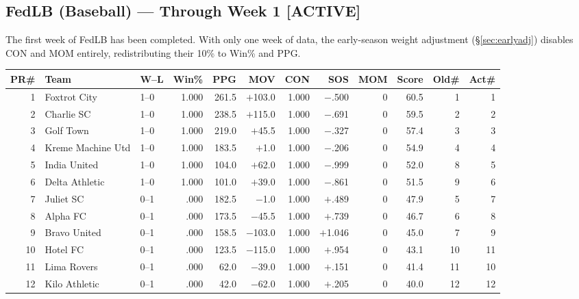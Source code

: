 \documentclass[11pt,a4paper]{article}
\begin{document}
\subsection{FedLB (Baseball) --- Through Week 1 [ACTIVE]}

The first week of FedLB has been completed. With only one week of data, the early-season weight adjustment (\S\ref{sec:earlyadj}) disables CON and MOM entirely, redistributing their 10\% to Win\% and PPG.

\begin{table}[H]
\centering\small
\begin{tabular}{@{}rl l r r r r r r r r r@{}}
\toprule
\textbf{PR\#} & \textbf{Team} & \textbf{W--L} & \textbf{Win\%} & \textbf{PPG} & \textbf{MOV} & \textbf{CON} & \textbf{SOS} & \textbf{MOM} & \textbf{Score} & \textbf{Old\#} & \textbf{Act\#}\\
\midrule
1 & Foxtrot City & 1--0 & 1.000 & 261.5 & $+$103.0 & 1.000 & $-$.500 & 0 & 60.5 & 1 & 1\\
2 & Charlie SC & 1--0 & 1.000 & 238.5 & $+$115.0 & 1.000 & $-$.691 & 0 & 59.5 & 2 & 2\\
3 & Golf Town & 1--0 & 1.000 & 219.0 & $+$45.5 & 1.000 & $-$.327 & 0 & 57.4 & 3 & 3\\
4 & Kreme Machine Utd & 1--0 & 1.000 & 183.5 & $+$1.0 & 1.000 & $-$.206 & 0 & 54.9 & 4 & 4\\
5 & India United & 1--0 & 1.000 & 104.0 & $+$62.0 & 1.000 & $-$.999 & 0 & 52.0 & 8 & 5\\
6 & Delta Athletic & 1--0 & 1.000 & 101.0 & $+$39.0 & 1.000 & $-$.861 & 0 & 51.5 & 9 & 6\\
7 & Juliet SC & 0--1 & .000 & 182.5 & $-$1.0 & 1.000 & $+$.489 & 0 & 47.9 & 5 & 7\\
8 & Alpha FC & 0--1 & .000 & 173.5 & $-$45.5 & 1.000 & $+$.739 & 0 & 46.7 & 6 & 8\\
9 & Bravo United & 0--1 & .000 & 158.5 & $-$103.0 & 1.000 & $+$1.046 & 0 & 45.0 & 7 & 9\\
10 & Hotel FC & 0--1 & .000 & 123.5 & $-$115.0 & 1.000 & $+$.954 & 0 & 43.1 & 10 & 11\\
11 & Lima Rovers & 0--1 & .000 & 62.0 & $-$39.0 & 1.000 & $+$.151 & 0 & 41.4 & 11 & 10\\
12 & Kilo Athletic & 0--1 & .000 & 42.0 & $-$62.0 & 1.000 & $+$.205 & 0 & 40.0 & 12 & 12\\
\bottomrule
\end{tabular}
\end{table}
\end{document}
